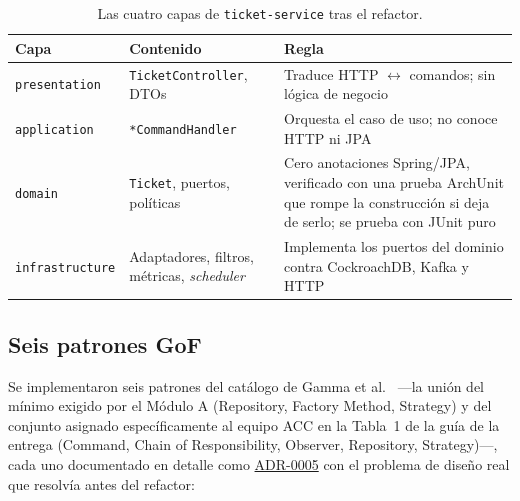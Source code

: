 \begin{table}[H]
\centering
\small
\caption{Las cuatro capas de \texttt{ticket-service} tras el refactor.}
\label{tab:capas-e4}
\begin{tabular}{@{}p{2.6cm}p{5.8cm}p{5.1cm}@{}}
\toprule
\textbf{Capa} & \textbf{Contenido} & \textbf{Regla} \\
\midrule
\texttt{presentation} & \texttt{TicketController}, DTOs & Traduce HTTP $\leftrightarrow$ comandos; sin lógica de negocio \\
\texttt{application} & \texttt{*CommandHandler} & Orquesta el caso de uso; no conoce HTTP ni JPA \\
\texttt{domain} & \texttt{Ticket}, puertos, políticas & Cero anotaciones Spring/JPA, verificado
  con una prueba ArchUnit que rompe la construcción si deja de serlo; se prueba con JUnit puro \\
\texttt{infrastructure} & Adaptadores, filtros, métricas, \emph{scheduler} & Implementa los puertos del dominio contra CockroachDB, Kafka y HTTP \\
\bottomrule
\end{tabular}
\end{table}

\subsection{Seis patrones GoF}

Se implementaron seis patrones del catálogo de Gamma et al.~\cite{gamma1994patterns} —la unión
del mínimo exigido por el Módulo A (Repository, Factory Method, Strategy) y del conjunto
asignado específicamente al equipo ACC en la Tabla~1 de la guía de la entrega (Command, Chain of
Responsibility, Observer, Repository, Strategy)—, cada uno documentado en detalle como
\href{run:../adr/0005-patrones-gof.md}{ADR-0005} con el problema de diseño real que resolvía
antes del refactor:

